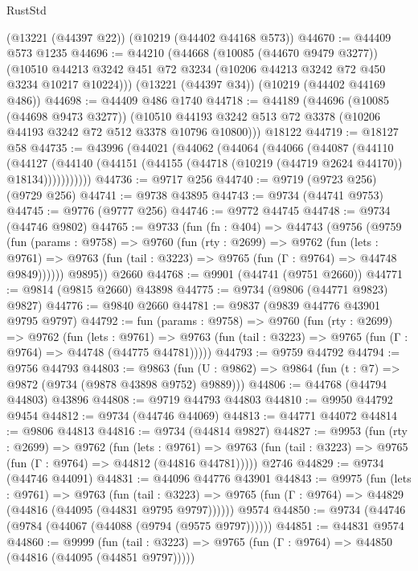 \begin{lexlean}{RustStd}
\begin{coremodule}
    (@13221 (@44397 @22))
    (@10219 (@44402 @44168 @573))
@44670 := @44409 @573 @1235
@44696 := @44210
    (@44668
      (@10085 (@44670 @9479 @3277))
      (@10510 @44213 @3242 @451 @72 @3234 (@10206 @44213 @3242 @72 @450 @3234 @10217 @10224)))
    (@13221 (@44397 @34))
    (@10219 (@44402 @44169 @486))
@44698 := @44409 @486 @1740
@44718 := @44189
    (@44696
      (@10085 (@44698 @9473 @3277))
      (@10510 @44193 @3242 @513 @72 @3378 (@10206 @44193 @3242 @72 @512 @3378 @10796 @10800)))
    @18122
@44719 := @18127 @58
@44735 := @43996
    (@44021
      (@44062
        (@44064
          (@44066
            (@44087
              (@44110
                (@44127
                  (@44140 (@44151 (@44155 (@44718 (@10219 (@44719 @2624 @44170)) @18134)))))))))))
@44736 := @9717 @256
@44740 := @9719 (@9723 @256) (@9729 @256)
@44741 := @9738 @43895
@44743 := @9734 (@44741 @9753)
@44745 := @9776 (@9777 @256)
@44746 := @9772 @44745
@44748 := @9734 (@44746 @9802)
@44765 := @9733
    (fun (fn : @404) =>
    @44743
      (@9756
        (@9759
          (fun (params : @9758) =>
          @9760
            (fun (rty : @2699) =>
            @9762
              (fun (lets : @9761) =>
              @9763 (fun (tail : @3223) => @9765 (fun (Γ : @9764) => @44748 @9849))))))
        @9895))
    @2660
@44768 := @9901 (@44741 (@9751 @2660))
@44771 := @9814 (@9815 @2660) @43898
@44775 := @9734 (@9806 (@44771 @9823) @9827)
@44776 := @9840 @2660
@44781 := @9837 (@9839 @44776 @43901 @9795 @9797)
@44792 := fun (params : @9758) =>
  @9760
    (fun (rty : @2699) =>
    @9762
      (fun (lets : @9761) =>
      @9763 (fun (tail : @3223) => @9765 (fun (Γ : @9764) => @44748 (@44775 @44781)))))
@44793 := @9759 @44792
@44794 := @9756 @44793
@44803 := @9863
    (fun (U : @9862) => @9864 (fun (t : @7) => @9872 (@9734 (@9878 @43898 @9752) @9889)))
@44806 := @44768 (@44794 @44803) @43896
@44808 := @9719 @44793 @44803
@44810 := @9950 @44792 @9454
@44812 := @9734 (@44746 @44069)
@44813 := @44771 @44072
@44814 := @9806 @44813
@44816 := @9734 (@44814 @9827)
@44827 := @9953
    (fun (rty : @2699) =>
    @9762
      (fun (lets : @9761) =>
      @9763 (fun (tail : @3223) => @9765 (fun (Γ : @9764) => @44812 (@44816 @44781)))))
    @2746
@44829 := @9734 (@44746 @44091)
@44831 := @44096 @44776 @43901
@44843 := @9975
    (fun (lets : @9761) =>
    @9763
      (fun (tail : @3223) =>
      @9765 (fun (Γ : @9764) => @44829 (@44816 (@44095 (@44831 @9795 @9797))))))
    @9574
@44850 := @9734 (@44746 (@9784 (@44067 (@44088 (@9794 (@9575 @9797))))))
@44851 := @44831 @9574
@44860 := @9999
    (fun (tail : @3223) => @9765 (fun (Γ : @9764) => @44850 (@44816 (@44095 (@44851 @9797)))))

\end{coremodule}
\end{lexlean}
